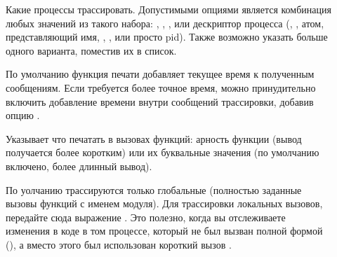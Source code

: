 \begin{description}
\item[] \hfill
	
		Какие процессы трассировать. Допустимыми опциями является комбинация любых значений из такого набора: , , , или дескриптор процесса (, , атом, представляющий имя, , , или просто pid). Также возможно указать больше одного варианта, поместив их в список.
		
	\item[] \hfill
	
		По умолчанию функция печати добавляет текущее время к полученным сообщениям. Если требуется более точное время, можно принудительно включить добавление времени внутри сообщений трассировки, добавив опцию \expression{\{timestamp, trace\}}.
		
	\item[] \hfill
	
		Указывает что печатать в вызовах функций: арность функции (вывод получается более коротким) или их буквальные значения (по умолчанию включено, более длинный вывод).
		
 	\item[] \hfill
	
		По уолчанию трассируются только глобальные (полностью заданные вызовы функций с именем модуля). Для трассировки локальных вызовов, передайте сюда выражение . Это полезно, когда вы отслеживаете изменения в коде в том процессе, который не был вызван полной формой (), а вместо этого был использован короткий вызов .
\end{description}


